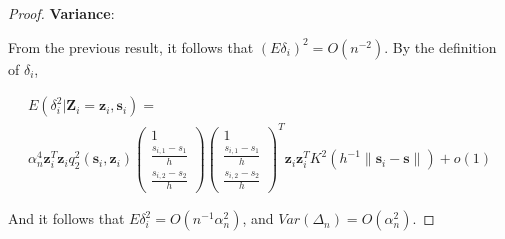 \documentclass[12pt,english,authoryear, review]{article}\usepackage[]{graphicx}\usepackage[]{color}
\theoremstyle{plain}
\theoremstyle{plain}
\begin{document}
\begin{proof}
\textbf{Variance}:

From the previous result, it follows that $\left(E\delta_{i}\right)^{2}=O\left(n^{-2}\right)$.
By the definition of $\delta_{i}$,

\begin{multline*}
E\left(\delta_{i}^{2}|\bm{Z}_{i}=\bm{z}_{i},\bm{s}_{i}\right)=\\
\alpha_{n}^{4}\bm{z}_{i}^{T}\bm{z}_{i}q_{2}^{2}\left(\bm{s}_{i},\bm{z}_{i}\right)\left(\begin{array}{c}
1\\
\frac{s_{i,1}-s_{1}}{h}\\
\frac{s_{i,2}-s_{2}}{h}
\end{array}\right)\left(\begin{array}{c}
1\\
\frac{s_{i,1}-s_{1}}{h}\\
\frac{s_{i,2}-s_{2}}{h}
\end{array}\right)^{T}\bm{z}_{i}\bm{z}_{i}^{T}K^{2}\left(h^{-1}\|\bm{s}_{i}-\bm{s}\|\right)+o\left(1\right)
\end{multline*}


And it follows that $E\delta_{i}^{2}=O\left(n^{-1}\alpha_{n}^{2}\right)$,
and $Var\left(\Delta_{n}\right)=O\left(\alpha_{n}^{2}\right)$.
\end{proof}


\end{document}
